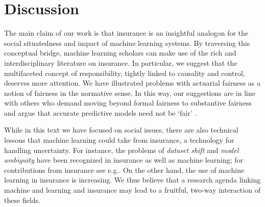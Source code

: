 \documentclass[11pt]{article} %
\makeatletter
\newcommand*{\eg}{e.g.\@\xspace}
\newcommand*{\versus}{vs.\@\xspace}
\makeatother
\begin{document}
\section{Discussion}
The main claim of our work is that insurance is an insightful analogon for the social situatedness and impact of machine learning systems. By traversing this conceptual bridge, machine learning scholars can make use of the rich and interdisciplinary literature on insurance. In particular, we suggest that the multifaceted concept of responsibility, tightly linked to causality and control, deserves more attention. 
We have illustrated problems with actuarial fairness as a notion of fairness in the normative sense. 
In this way, our suggestions are in line with others who demand moving beyond formal fairness to substantive fairness \citep{green2022escaping} and argue that accurate predictive models need not be `fair' \citep{eidelson2021patterned}.

While in this text we have focused on social issues, there are also technical lessons that machine learning could take from insurance, a technology for handling uncertainty. For instance, the problems of \textit{dataset shift} and \textit{model ambiguity} have been recognized in insurance as well as machine learning; for contributions from insurance see \eg \citep{milevsky2006killing,cabantous2007ambiguity,pichler2014insurance,dietz2021pricing}. 
On the other hand, the use of machine learning in insurance is increasing. We thus believe that a research agenda linking machine and learning and insurance may lead to a fruitful, two-way interaction of these fields.
\end{document}
